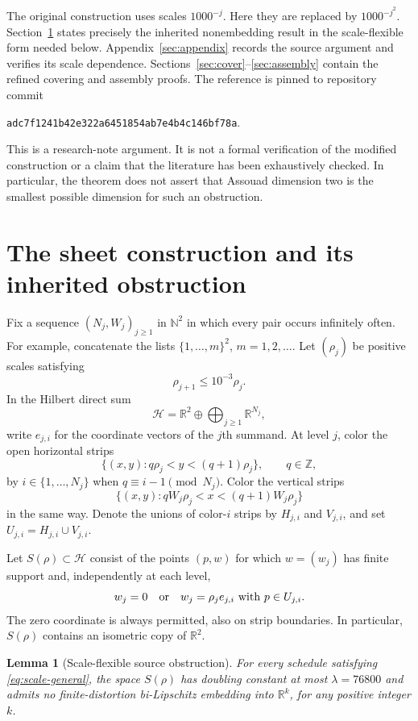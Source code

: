 \documentclass[11pt]{article}
\newtheorem{lemma}[theorem]{Lemma}
\theoremstyle{remark}
\newcommand{\R}{\mathbb R}
\newcommand{\N}{\mathbb N}
\newcommand{\Z}{\mathbb Z}
\begin{document}
The original construction uses scales $1000^{-j}$. Here they are replaced by $1000^{-j^2}$. Section~\ref{sec:source} states precisely the inherited nonembedding result in the scale-flexible form needed below. Appendix~\ref{sec:appendix} records the source argument and verifies its scale dependence. Sections~\ref{sec:cover}--\ref{sec:assembly} contain the refined covering and assembly proofs. The reference is pinned to repository commit
\begin{center}
\texttt{adc7f1241b42e322a6451854ab7e4b4c146bf78a}.
\end{center}
This is a research-note argument. It is not a formal verification of the modified construction or a claim that the literature has been exhaustively checked. In particular, the theorem does not assert that Assouad dimension two is the smallest possible dimension for such an obstruction.

\section{The sheet construction and its inherited obstruction}\label{sec:source}
Fix a sequence $(N_j,W_j)_{j\ge1}$ in $\N^2$ in which every pair occurs infinitely often. For example, concatenate the lists $\{1,\ldots,m\}^2$, $m=1,2,\ldots$. Let $(\rho_j)$ be positive scales satisfying
\begin{equation}\label{eq:scale-general}
 \rho_{j+1}\le 10^{-3}\rho_j.
\end{equation}
In the Hilbert direct sum
\[
 \mathcal H=\R^2\oplus\bigoplus_{j\ge1}\R^{N_j},
\]
write $e_{j,i}$ for the coordinate vectors of the $j$th summand. At level $j$, color the open horizontal strips
\[
 \{(x,y):q\rho_j<y<(q+1)\rho_j\},\qquad q\in\Z,
\]
by $i\in\{1,\ldots,N_j\}$ when $q\equiv i-1\pmod{N_j}$. Color the vertical strips
\[
 \{(x,y):qW_j\rho_j<x<(q+1)W_j\rho_j\}
\]
in the same way. Denote the unions of color-$i$ strips by $H_{j,i}$ and $V_{j,i}$, and set $U_{j,i}=H_{j,i}\cup V_{j,i}$.

Let $S(\rho)\subset\mathcal H$ consist of the points $(p,w)$ for which $w=(w_j)$ has finite support and, independently at each level,
\begin{equation}\label{eq:coordinate}
 w_j=0\quad\hbox{or}\quad w_j=\rho_j e_{j,i}\ \hbox{with }p\in U_{j,i}.
\end{equation}
The zero coordinate is always permitted, also on strip boundaries. In particular, $S(\rho)$ contains an isometric copy of $\R^2$.

\begin{lemma}[Scale-flexible source obstruction]\label{lem:source}
For every schedule satisfying \eqref{eq:scale-general}, the space $S(\rho)$ has doubling constant at most $\lambda=76800$ and admits no finite-distortion bi-Lipschitz embedding into $\R^k$, for any positive integer $k$.
\end{lemma}
\end{document}
